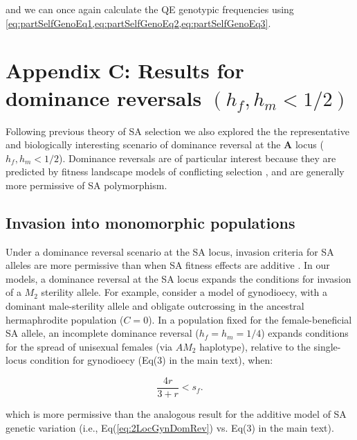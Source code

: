 \documentclass{article}
\begin{document}
\noindent and we can once again calculate the QE genotypic frequencies using \cref{eq:partSelfGenoEq1,eq:partSelfGenoEq2,eq:partSelfGenoEq3}.



\newpage{}
\section*{Appendix C: Results for dominance reversals $(h_f,h_m < 1/2)$}
\renewcommand{\theequation}{C\arabic{equation}}
\setcounter{equation}{0}
\renewcommand{\thefigure}{C\arabic{figure}}
\setcounter{figure}{0}

Following previous theory of SA selection we also explored the the representative and biologically interesting scenario of dominance reversal at the $\mathbf{A}$ locus ($h_f,h_m < 1/2$). Dominance reversals are of particular interest because they are predicted by fitness landscape models of conflicting selection \citep{Fry2010, ConnallonClark2014}, and are generally more permissive of SA polymorphism.



\subsection*{Invasion into monomorphic populations} 

Under a dominance reversal scenario at the SA locus, invasion criteria for SA alleles are more permissive than when SA fitness effects are additive \citep{Kidwell1977, ConnallonClark2012, JordanConnallon2014, Olito2016}. In our models, a dominance reversal at the SA locus expands the conditions for invasion of a $M_2$ sterility allele. For example, consider a model of gynodioecy, with a dominant male-sterility allele and obligate outcrossing in the ancestral hermaphrodite population ($C=0$). In a population fixed for the female-beneficial SA allele, an incomplete dominance reversal ($h_f=h_m=1/4$) expands conditions for the spread of unisexual females (via $AM_2$ haplotype), relative to the single-locus condition for gynodioecy (Eq(3) in the main text), when:

\begin{equation}\label{eq:2LocGynDomRev}
    \frac{4 r}{3 + r} < s_f.
\end{equation}

\noindent which is more permissive than the analogous result for the additive model of SA genetic variation (i.e., Eq(\ref{eq:2LocGynDomRev}) vs. Eq(3) in the main text).
\end{document}
